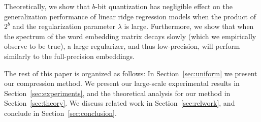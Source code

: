 Theoretically, we show that $b$-bit quantization has negligible effect on the generalization performance of linear ridge regression models when the product of $2^b$ and the regularization parameter $\lambda$ is large.
Furthermore, we show that when the spectrum of the word embedding matrix decays slowly (which we empirically observe to be true), a large regularizer, and thus low-precision, will perform similarly to the full-precision embeddings. 


The rest of this paper is organized as follows: In Section~\ref{sec:uniform} we present our compression method. We present our large-scale experimental results in Section~\ref{sec:experiments}, and the theoretical analysis for our method in Section~\ref{sec:theory}. We discuss related work in Section~\ref{sec:relwork}, and conclude in Section~\ref{sec:conclusion}.

